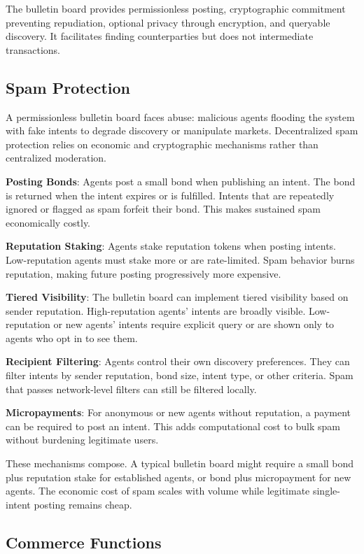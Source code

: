 \documentclass{article}
\begin{document}
The bulletin board provides permissionless posting, cryptographic commitment preventing repudiation, optional privacy through encryption, and queryable discovery. It facilitates finding counterparties but does not intermediate transactions.

\subsection{Spam Protection}

A permissionless bulletin board faces abuse: malicious agents flooding the system with fake intents to degrade discovery or manipulate markets. Decentralized spam protection relies on economic and cryptographic mechanisms rather than centralized moderation.

\textbf{Posting Bonds}: Agents post a small bond when publishing an intent. The bond is returned when the intent expires or is fulfilled. Intents that are repeatedly ignored or flagged as spam forfeit their bond. This makes sustained spam economically costly.

\textbf{Reputation Staking}: Agents stake reputation tokens when posting intents. Low-reputation agents must stake more or are rate-limited. Spam behavior burns reputation, making future posting progressively more expensive.

\textbf{Tiered Visibility}: The bulletin board can implement tiered visibility based on sender reputation. High-reputation agents' intents are broadly visible. Low-reputation or new agents' intents require explicit query or are shown only to agents who opt in to see them.

\textbf{Recipient Filtering}: Agents control their own discovery preferences. They can filter intents by sender reputation, bond size, intent type, or other criteria. Spam that passes network-level filters can still be filtered locally.

\textbf{Micropayments}: For anonymous or new agents without reputation, a payment can be required to post an intent. This adds computational cost to bulk spam without burdening legitimate users.

These mechanisms compose. A typical bulletin board might require a small bond plus reputation stake for established agents, or bond plus micropayment for new agents. The economic cost of spam scales with volume while legitimate single-intent posting remains cheap.

\subsection{Commerce Functions}
\end{document}
